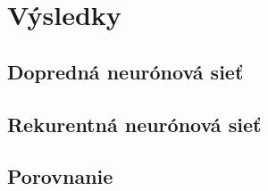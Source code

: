 \chapter{Výsledky} \label{res}
\section{Dopredná neurónová sieť}
\section{Rekurentná neurónová sieť}
\section{Porovnanie}